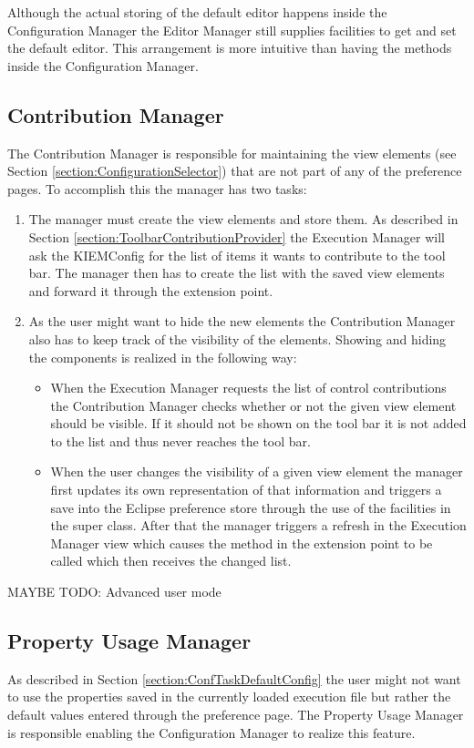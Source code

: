 Although the actual storing of the default editor happens inside the Configuration Manager the Editor Manager
still supplies facilities to get and set the default editor. This arrangement is more intuitive than having
the methods inside the Configuration Manager.


\subsection{Contribution Manager}
\label{section:ContributionManager}
The Contribution Manager is responsible for maintaining the view elements (see Section \ref{section:ConfigurationSelector}) 
that are not part of any of the preference pages. To accomplish this the manager has two tasks:
\begin{enumerate}
 \item The manager must create the view elements and store them. As described in Section 
\ref{section:ToolbarContributionProvider} the Execution Manager will ask the \ac{KIEMConfig}
for the list of items it wants to contribute to the tool bar. The manager then has to 
create the list with the saved view elements and forward it through the extension point.
 \item As the user might want to hide the new elements the Contribution Manager also has to 
keep track of the visibility of the elements. Showing and hiding the components is realized
in the following way:
\begin{itemize}
 \item When the Execution Manager requests the list of control contributions the Contribution Manager
checks whether or not the given view element should be visible. If it should not be shown on the tool bar
it is not added to the list and thus never reaches the tool bar.
 \item When the user changes the visibility of a given view element the manager first updates its own
representation of that information and triggers a save into the Eclipse preference store through the use
of the facilities in the super class. After that the manager triggers a refresh in the Execution Manager
view which causes the method in the extension point to be called which then receives the changed list.
\end{itemize}
\end{enumerate}

MAYBE TODO:
Advanced user mode


\subsection{Property Usage Manager}
\label{section:Property Usage Manager}
As described in Section \ref{section:ConfTaskDefaultConfig} the user might not want to use
the properties saved in the currently loaded execution file but rather the default values
entered through the preference page. The Property Usage Manager is responsible enabling
the Configuration Manager to realize this feature.

